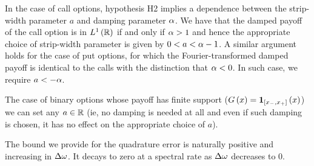 \documentclass[11pt]{amsart}
\begin{document}
\begin{remark} \label{remark:callPut}
In the case of call options, hypothesis H2
implies a dependence between the strip-width parameter
$a$ and damping parameter $\alpha$. We have that the
damped payoff of the call option is in $L^1 \left( {\mathbb{R}} \right)$
if and only if $\alpha > 1$ and hence the appropriate choice
of strip-width parameter is given by $0<a< \alpha-1$.
A similar argument holds for the case of put options, for
which the Fourier-transformed damped payoff is identical
to the calls with the distinction that $\alpha <0$.
In such case, we require $a < -\alpha$.

The case of binary options whose payoff has finite support
($G \left( {x} \right) = \mathbf{1}_{[x_-,x_+]} \left( {x} \right)$) 
we can set any $a \in \mathbb{R}$ (ie, no damping is needed at all and
even if such damping is chosen, it has no effect on the appropriate
choice of $a$). 
\end{remark}

\begin{remark}
The bound we provide for the quadrature error is naturally positive and increasing in $\Delta\omega$.
It decays to zero at a spectral rate as $\Delta\omega$ decreases to 0.
\end{remark}
\end{document}
